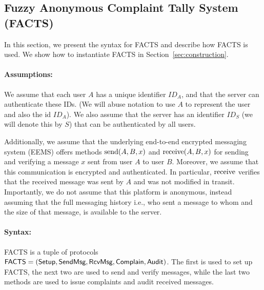 \subsection{Fuzzy Anonymous Complaint Tally System (FACTS)}\label{sec:facts}

In this section, we present the syntax for FACTS and describe how FACTS is used.  We show how to instantiate FACTS in Section~\ref{sec:construction}.

\paragraph{Assumptions:}
We assume that each user $A$ has a unique identifier $ID_A$, and that the server can authenticate these IDs.  (We will abuse notation to use $A$ to represent the user and also the id $ID_A$).  We also assume that the server has an identifier $ID_S$ (we will denote this by $S$) that can be authenticated by all users.

Additionally, we assume that the underlying end-to-end encrypted messaging system (EEMS) offers methods $\textrm{send}(A,B,x)$ and $\textrm{receive}(A,B,x)$ for sending and verifying a message $x$ sent from user $A$ to user $B$.  Moreover, we assume that this communication is encrypted and authenticated. In particular, $\textrm{receive}$ verifies that the received message was sent by $A$ and was not modified in transit.  Importantly, we do not assume that this platform is anonymous, instead assuming that the full messaging history i.e., who sent a message to whom and the size of that message, is available to the server. 

\paragraph{Syntax:}
FACTS is a tuple of protocols $\textsf{FACTS}=(\textsf{Setup}, \textsf{SendMsg}, \textsf{RcvMsg}, \textsf{Complain}, \textsf{Audit})$.  The first is used to set up FACTS, the next two are used to send and verify messages, while the last two methods are used to issue complaints and audit received messages.

